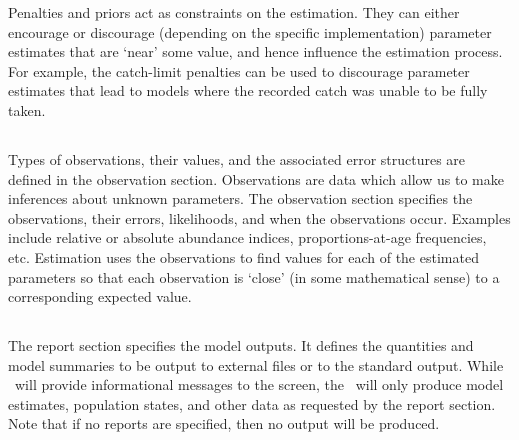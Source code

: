 Penalties and priors act as constraints on the estimation. They can either encourage or discourage (depending on the specific implementation) parameter estimates that are `near' some value, and hence influence the estimation process. For example, the catch-limit penalties can be used to discourage parameter estimates that lead to models where the recorded catch was unable to be fully taken.

\subsection{}

Types of observations, their values, and the associated error structures are defined in the observation section. Observations are data which allow us to make inferences about unknown parameters. The observation section specifies the observations, their errors, likelihoods, and when the observations occur. Examples include relative or absolute abundance indices, proportions-at-age frequencies, etc. Estimation uses the observations to find values for each of the estimated parameters so that each observation is `close' (in some mathematical sense) to a corresponding expected value. 

\subsection{}

The report section specifies the model outputs. It defines the quantities and model summaries to be output to external files or to the standard output. While \SPM\ will provide informational messages to the screen, the \SPM\ will only produce model estimates, population states, and other data as requested by the report section. Note that if no reports are specified, then no output will be produced.
